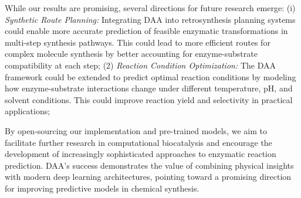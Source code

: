 \documentclass[sigconf]{acmart}
\begin{document}
While our results are promising, several directions for future research emerge:  (i) \textit{Synthetic Route Planning:} Integrating DAA into retrosynthesis planning systems could enable more accurate prediction of feasible enzymatic transformations in multi-step synthesis pathways. This could lead to more efficient routes for complex molecule synthesis by better accounting for enzyme-substrate compatibility at each step; (2) \textit{Reaction Condition Optimization:} The DAA framework could be extended to predict optimal reaction conditions by modeling how enzyme-substrate interactions change under different temperature, pH, and solvent conditions. This could improve reaction yield and selectivity in practical applications;

By open-sourcing our implementation and pre-trained models, we aim to facilitate further research in computational biocatalysis and encourage the development of increasingly sophisticated approaches to enzymatic reaction prediction. DAA's success demonstrates the value of combining physical insights with modern deep learning architectures, pointing toward a promising direction for improving predictive models in chemical synthesis.



\end{document}
